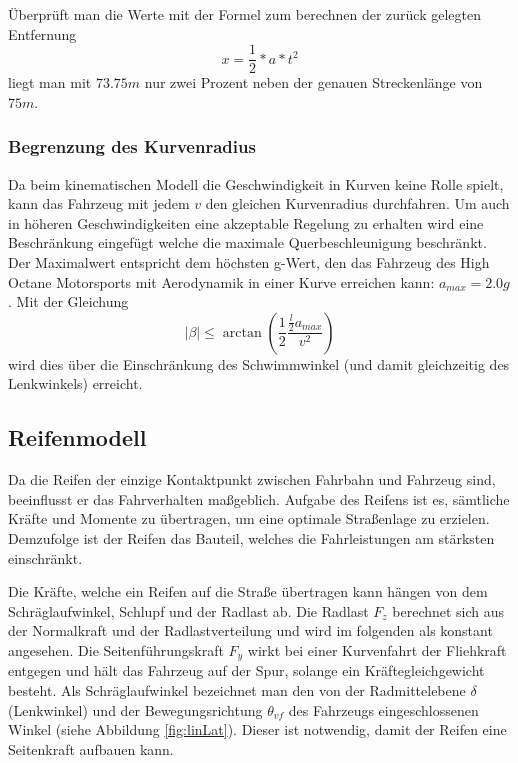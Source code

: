 \documentclass{like}
\begin{document}
Überprüft man die Werte mit der Formel zum berechnen der zurück gelegten Entfernung 
\begin{equation}
x = \frac{1}{2} * a * t^2  
\end{equation}
liegt man mit \(73.75m\) nur zwei Prozent neben der genauen Streckenlänge von \(75m\).

\subsubsection*{Begrenzung des Kurvenradius}
Da beim kinematischen Modell die Geschwindigkeit in Kurven keine Rolle spielt, kann das Fahrzeug mit jedem \(v\) den gleichen Kurvenradius durchfahren. Um auch in höheren Geschwindigkeiten eine akzeptable Regelung zu erhalten wird eine Beschränkung eingefügt welche die maximale Querbeschleunigung beschränkt. Der Maximalwert entspricht dem höchsten g-Wert, den das Fahrzeug des High Octane Motorsports mit Aerodynamik in einer Kurve erreichen kann: $a_{max} = 2.0g$. 
Mit der Gleichung
\begin{equation}
	|\beta| \leq \arctan(\frac{1}{2} \frac{\frac{l}{2} a_{max}}{v^2})
\end{equation}
wird dies über die Einschränkung des Schwimmwinkel (und damit gleichzeitig des Lenkwinkels) erreicht.


\subsection{Reifenmodell}
\label{tireModel}
Da die Reifen der einzige Kontaktpunkt zwischen Fahrbahn und Fahrzeug sind,  beeinflusst er das Fahrverhalten maßgeblich. Aufgabe des Reifens ist es, sämtliche Kräfte und Momente zu übertragen, um eine optimale Straßenlage zu erzielen. Demzufolge ist der Reifen das Bauteil, welches die Fahrleistungen am stärksten einschränkt.

Die Kräfte, welche ein Reifen auf die Straße übertragen kann hängen von dem Schräglaufwinkel, Schlupf und der Radlast ab. Die Radlast \(F_z\) berechnet sich aus der Normalkraft und der Radlastverteilung und wird im folgenden als konstant angesehen.
Die Seitenführungskraft \(F_y\) wirkt bei einer Kurvenfahrt der Fliehkraft entgegen und hält das Fahrzeug auf der Spur, solange ein Kräftegleichgewicht besteht. Als Schräglaufwinkel bezeichnet man den von der Radmittelebene \(\delta\) (Lenkwinkel) und der Bewegungsrichtung \(\theta_{vf}\) des Fahrzeugs eingeschlossenen Winkel (siehe Abbildung \ref{fig:linLat}). Dieser ist notwendig, damit der Reifen eine Seitenkraft aufbauen kann. \\
\end{document}

